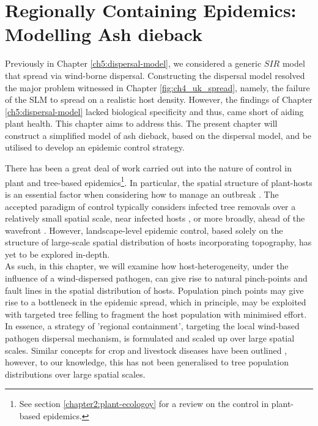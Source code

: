 \chapter{Regionally Containing Epidemics: Modelling Ash dieback}


Previously in Chapter \ref{ch5:dispersal-model}, we considered a generic $SIR$ model that spread via wind-borne dispersal. Constructing the dispersal model resolved the major problem witnessed in Chapter \ref{fig:ch4_uk_spread}, namely, the failure of the SLM to spread on a realistic host density. However, the findings of Chapter \ref{ch5:dispersal-model} lacked biological specificity and thus, came short of aiding plant health. This chapter aims to address this. The present chapter will construct a simplified model of ash dieback, based on the dispersal model, and be utilised to develop an epidemic control strategy.

There has been a great deal of work carried out into the nature of control in plant and tree-based epidemics\footnote{See section \ref{chapter2:plant-ecologoy} for a review on the control in plant-based epidemics.}. In particular, the spatial structure of plant-hosts is an essential factor when considering how to manage an outbreak \cite{spatial-control-optimisation, control-heterogeneous-landscapes}. The accepted paradigm of control typically considers infected tree removals over a relatively small spatial scale, near infected hosts \cite{WEBIDEMICS}, or more broadly, ahead of the wavefront \cite{large-scale-control}. However, landscape-level epidemic control, based solely on the structure of large-scale spatial distribution of hosts incorporating topography, has yet to be explored in-depth.\\

As such, in this chapter, we will examine how host-heterogeneity, under the influence of a wind-dispersed pathogen, can give rise to natural pinch-points and fault lines in the spatial distribution of hosts. Population pinch points may give rise to a bottleneck in the epidemic spread, which in principle, may be exploited with targeted tree felling to fragment the host population with minimised effort. In essence, a strategy of 'regional containment', targeting the local wind-based pathogen dispersal mechanism, is formulated and scaled up over large spatial scales. Similar concepts for crop and livestock diseases have been outlined \cite{PAPAIX201435, GILIOLI20131, Gilligan-disease-management}, however, to our knowledge, this has not been generalised to tree population distributions over large spatial scales.

